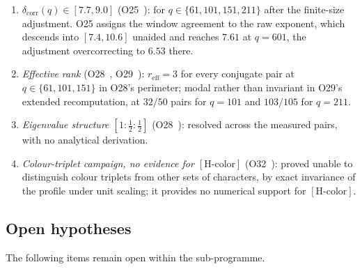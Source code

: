 \documentclass[11pt,a4paper]{article}
\theoremstyle{definition}
\begin{document}
      \begin{enumerate}
        \item \textit{$\delta_{\mathrm{corr}}(q) \in [7.7, 9.0]$} (O25~\cite{Beau2026a29}): for
        $q \in \{61, 101, 151, 211\}$ after the finite-size adjustment.
        O25 assigns the window agreement to the raw exponent, which descends into
        $[7.4, 10.6]$ unaided and reaches $7.61$ at $q = 601$, the adjustment overcorrecting to
        $6.53$ there.

        \item \textit{Effective rank} (O28~\cite{Beau2026a32}, O29~\cite{Beau2026a33}):
        $r_{\mathrm{eff}} = 3$ for every conjugate pair at $q \in \{61, 101, 151\}$ in O28's
        perimeter; modal rather than invariant in O29's extended recomputation, at $32/50$ pairs
        for $q = 101$ and $103/105$ for $q = 211$.

        \item \textit{Eigenvalue structure $[1:\tfrac{1}{2}:\tfrac{1}{2}]$} (O28~\cite{Beau2026a32}):
        resolved across the measured pairs, with no analytical derivation.

        \item \textit{Colour-triplet campaign, no evidence for $[\mathrm{H\text{-}color}]$} (O32~\cite{Beau2026a36}):
        proved unable to distinguish colour triplets from other sets of characters, by exact
        invariance of the profile under unit scaling; it provides no numerical support for
        $[\mathrm{H\text{-}color}]$.
      \end{enumerate}

    \subsection{Open hypotheses}
      \label{sec:open-hyp}

      The following items remain open within the sub-programme.
\end{document}
